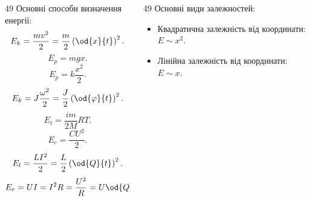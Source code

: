 \documentclass[14pt,handout,utf8]{beamer}
\newlength\TW
\newcommand{\Xhead}[1]{
 \begin{center}%
      \textbf{#1}%
 \end{center}%
}
\begin{document}
\begin{frame}
  \frametitle{~}

  \begin{columns}
    \begin{column}{49\TW}
      Основні способи визначення енергії:
      \begin{equation}
        E_k = \frac{mv^2}{2} = \frac{m}{2} \left( \od{x}{t} \right)^2.
        \label{atu:eq:Ek_v}
      \end{equation}
      \begin{equation}
        E_p = m g x .
        \label{atu:eq:Ep_g}
      \end{equation}
      \begin{equation}
        E_p = k \frac{x^2}{2} .
        \label{atu:eq:Ep_spring}
      \end{equation}
      \begin{equation}
        E_k = J \frac{\omega^2}{2} = \frac{J}{2} \left( \od{\varphi}{t} \right)^2 .
        \label{atu:eq:Ek_spin}
      \end{equation}
      \begin{equation}
        E_t = \frac{im}{2M} RT.
        \label{atu:eq:Et}
      \end{equation}
      \begin{equation}
        E_c = \frac{C U^2}{2}.
        \label{atu:eq:Ec}
      \end{equation}
      \begin{equation}
        E_l = \frac{L I^2}{2} = \frac{L}{2} \left( \od{Q}{t}\right)^2 .
        \label{atu:eq:El}
      \end{equation}
      \begin{equation}
        E_r = U I = I^2 R = \frac{U^2}{R} = U \od{Q}{t} .
        \label{atu:eq:Er}
      \end{equation}

    \end{column}
    \hspace{-10pt}
    \vrule{}
    \begin{column}{49\TW}
      Основні види залежностей:

      \begin{itemize}

        \item
          Квадратична залежність від координати:
          $E \sim x^2$.

        \item
          Лінійна залежність від координати:
          $E \sim x$.


\end{itemize}
\end{column}
\end{columns}
\end{frame}
\end{document}
